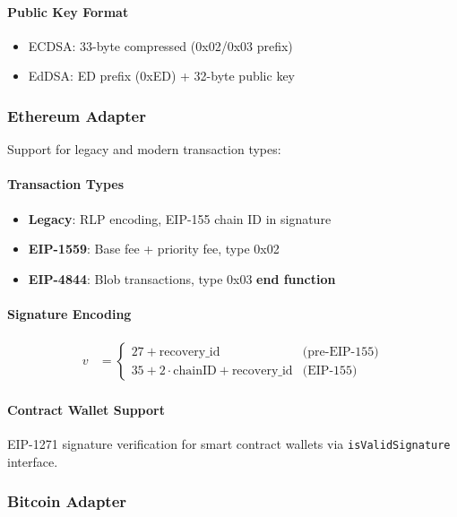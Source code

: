 \documentclass[11pt,twocolumn]{article}
\begin{document}
\paragraph{Public Key Format}
\begin{itemize}
\item ECDSA: 33-byte compressed (0x02/0x03 prefix)
\item EdDSA: ED prefix (0xED) + 32-byte public key
\end{itemize}

\subsubsection{Ethereum Adapter}

Support for legacy and modern transaction types:

\paragraph{Transaction Types}
\begin{itemize}
\item \textbf{Legacy}: RLP encoding, EIP-155 chain ID in signature
\item \textbf{EIP-1559}: Base fee + priority fee, type 0x02
\item \textbf{EIP-4844}: Blob transactions, type 0x03
\State \textbf{end function}
\end{itemize}

\paragraph{Signature Encoding}
\begin{align*}
v &= \begin{cases}
27 + \text{recovery\_id} & \text{(pre-EIP-155)} \\
35 + 2 \cdot \text{chainID} + \text{recovery\_id} & \text{(EIP-155)}
\end{cases}
\end{align*}

\paragraph{Contract Wallet Support} EIP-1271 signature verification for smart contract wallets via \texttt{isValidSignature} interface.

\subsubsection{Bitcoin Adapter}
\end{document}
